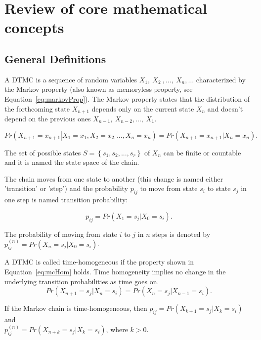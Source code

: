 \documentclass[nojss]{jss}
\begin{document}
\section{Review of core mathematical concepts}\label{sec:mathematic}

\subsection{General Definitions}

A DTMC is a sequence of random variables $X_{1},\: X_{2}\: ,\ldots,\:X_{n},\ldots$ characterized by the Markov property (also known as memoryless property, see
Equation~\ref{eq:markovProp}). The Markov property states that the distribution of the forthcoming state $X_{n+1}$ depends only on the current state $X_{n}$ and doesn't depend on the previous ones $X_{n-1},\: X_{n-2},\ldots,\: X_{1}$.

\begin{equation}
Pr\left(X_{n+1}=x_{n+1}\left|X_{1}=x_{1},X_{2}=x_{2,}...,X_{n}=x_{n}\right.\right)=Pr\left(X_{n+1}=x_{n+1}\left|X_{n}=x_{n}\right.\right).
\label{eq:markovProp}
\end{equation}

The set of possible states $S=\left\{ s_{1},s_{2},...,s_{r}\right\}$ of $X_{n}$ can be finite or countable and it is named the state space of the chain.

The chain moves  from one state to another (this change
is named either 'transition' or 'step') and the probability $p_{ij}$ to move
from state $s_{i}$ to state $s_{j}$ in one step is named transition probability:

\begin{equation}
p_{ij}=Pr\left(X_{1}=s_{j}\left|X_{0}=s_{i}\right.\right).
\label{eq:trProp}
\end{equation}

The probability of moving from state $i$ to $j$ in $n$ steps is denoted by
$p_{ij}^{(n)}=Pr\left(X_{n}=s_{j}\left|X_{0}=s_{i}\right.\right)$. 

A DTMC is called time-homogeneous if the property shown in Equation~\ref{eq:mcHom} holds. Time homogeneity implies no change in the underlying transition probabilities as time goes on.
\begin{equation}
Pr\left(X_{n+1}=s_{j}\left|X_{n}=s_{i}\right.\right)=Pr\left(X_{n}=s_{j}\left|X_{n-1}=s_{i}\right.\right).
\label{eq:mcHom}
\end{equation}

If the Markov chain is time-homogeneous, then $p_{ij}=Pr\left(X_{k+1}=s_{j}\left|X_{k}=s_{i}\right.\right)$
and \\ $p_{ij}^{(n)}=Pr\left(X_{n+k}=s_{j}\left|X_{k}=s_{i}\right.\right)$,
where $k>0$.
\end{document}
